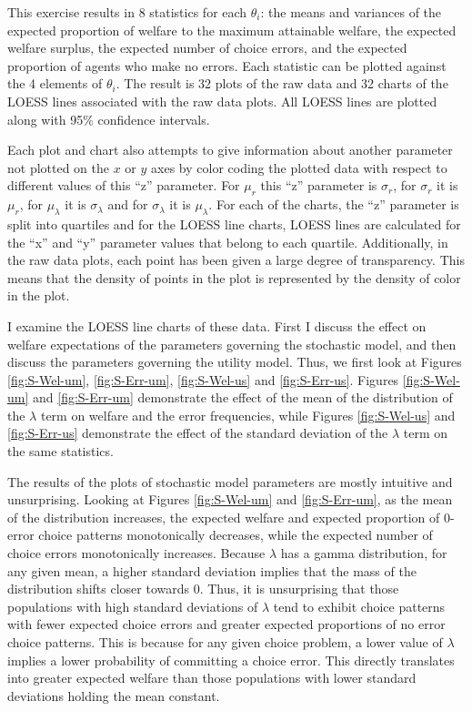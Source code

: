 \documentclass[../main.tex]{subfiles}
\begin{document}
This exercise results in 8 statistics for each $\theta_i$: the means and variances of the expected proportion of welfare to the maximum attainable welfare, the expected welfare surplus, the expected number of choice errors, and the expected proportion of agents who make no errors.
Each statistic can be plotted against the 4 elements of $\theta_i$.
The result is 32 plots of the raw data and 32 charts of the LOESS lines associated with the raw data plots.
All LOESS lines are plotted along with 95\% confidence intervals.

Each plot and chart also attempts to give information about another parameter not plotted on the $x$ or $y$ axes by color coding the plotted data with respect to different values of this \enquote{z} parameter.
For $\mu_r$ this \enquote{z} parameter is $\sigma_r$, for $\sigma_r$ it is $\mu_r$, for $\mu_\lambda$ it is $\sigma_\lambda$ and for $\sigma_\lambda$ it is $\mu_\lambda$.
For each of the charts, the \enquote{z} parameter is split into quartiles and for the LOESS line charts, LOESS lines are calculated for the \enquote{x} and \enquote{y} parameter values that belong to each quartile.
Additionally, in the raw data plots, each point has been given a large degree of transparency.
This means that the density of points in the plot is represented by the density of color in the plot.

I examine the LOESS line charts of these data.
First I discuss the effect on welfare expectations of the parameters governing the stochastic model, and then discuss the parameters governing the utility model.
Thus, we first look at Figures \ref{fig:S-Wel-um}, \ref{fig:S-Err-um}, \ref{fig:S-Wel-us} and \ref{fig:S-Err-us}.
Figures \ref{fig:S-Wel-um} and \ref{fig:S-Err-um} demonstrate the effect of the mean of the distribution of the $\lambda$ term on welfare and the error frequencies, while Figures \ref{fig:S-Wel-us} and \ref{fig:S-Err-us} demonstrate the effect of the standard deviation of the $\lambda$ term on the same statistics.

The results of the plots of stochastic model parameters are mostly intuitive and unsurprising.
Looking at Figures \ref{fig:S-Wel-um} and \ref{fig:S-Err-um}, as the mean of the distribution increases, the expected welfare and expected proportion of 0-error choice patterns monotonically decreases, while the expected number of choice errors monotonically increases.
Because $\lambda$ has a gamma distribution, for any given mean, a higher standard deviation implies that the mass of the distribution shifts closer towards $0$.
Thus, it is unsurprising that those populations with high standard deviations of $\lambda$ tend to exhibit choice patterns with fewer expected choice errors and greater expected proportions of no error choice patterns.
This is because for any given choice problem, a lower value of $\lambda$ implies a lower probability of committing a choice error.{\footnotemark}
This directly translates into greater expected welfare than those populations with lower standard deviations holding the mean constant.
\end{document}
